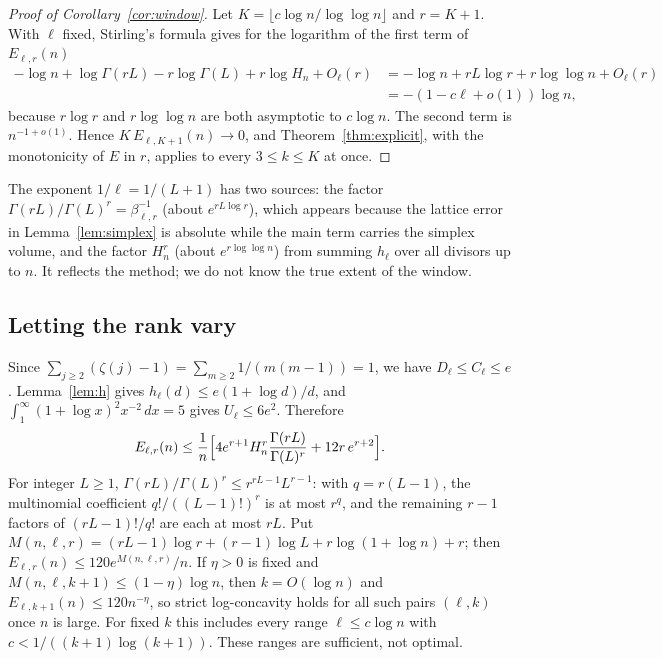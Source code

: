 \documentclass[11pt,a4paper]{article}
\theoremstyle{remark}
\numberwithin{equation}{section}
\begin{document}
\begin{proof}[Proof of Corollary~\ref{cor:window}]
Let $K=\lfloor c\log n/\log\log n\rfloor$ and $r=K+1$. With $\ell$ fixed, Stirling's formula gives for the logarithm of the first term of $E_{\ell,r}(n)$
\[
\begin{aligned}-\log n+\log\Gamma(rL)-r\log\Gamma(L)+r\log H_n+O_\ell(r)&=-\log n+rL\log r+r\log\log n+O_\ell(r)\\&=-(1-c\ell+o(1))\log n,\end{aligned}
\]
because $r\log r$ and $r\log\log n$ are both asymptotic to $c\log n$. The second term is $n^{-1+o(1)}$. Hence $K\,E_{\ell,K+1}(n)\to0$, and Theorem~\ref{thm:explicit}, with the monotonicity of $E$ in $r$, applies to every $3\le k\le K$ at once.
\end{proof}

The exponent $1/\ell=1/(L+1)$ has two sources: the factor $\Gamma(rL)/\Gamma(L)^r=\beta_{\ell,r}^{-1}$ (about $e^{rL\log r}$), which appears because the lattice error in Lemma~\ref{lem:simplex} is absolute while the main term carries the simplex volume, and the factor $H_n^r$ (about $e^{r\log\log n}$) from summing $h_\ell$ over all divisors up to $n$. It reflects the method; we do not know the true extent of the window.

\subsection{Letting the rank vary}
Since $\sum_{j\ge2}(\zeta(j)-1)=\sum_{m\ge2}1/(m(m-1))=1$, we have $D_\ell\le C_\ell\le e$. Lemma~\ref{lem:h} gives $h_\ell(d)\le e(1+\log d)/d$, and $\int_1^\infty(1+\log x)^2x^{-2}\,dx=5$ gives $U_\ell\le6e^2$. Therefore
\begin{equation}\label{eq:Erank}
E_{\ell,r}(n)\le\frac1n\Bigl[4e^{r+1}H_n^r\frac{\Gamma(rL)}{\Gamma(L)^r}+12r\,e^{r+2}\Bigr].
\end{equation}
For integer $L\ge1$, $\Gamma(rL)/\Gamma(L)^r\le r^{rL-1}L^{r-1}$: with $q=r(L-1)$, the multinomial coefficient $q!/((L-1)!)^r$ is at most $r^q$, and the remaining $r-1$ factors of $(rL-1)!/q!$ are each at most $rL$. Put $M(n,\ell,r)=(rL-1)\log r+(r-1)\log L+r\log(1+\log n)+r$; then $E_{\ell,r}(n)\le120e^{M(n,\ell,r)}/n$. If $\eta>0$ is fixed and $M(n,\ell,k+1)\le(1-\eta)\log n$, then $k=O(\log n)$ and $E_{\ell,k+1}(n)\le120n^{-\eta}$, so strict log-concavity holds for all such pairs $(\ell,k)$ once $n$ is large. For fixed $k$ this includes every range $\ell\le c\log n$ with $c<1/((k+1)\log(k+1))$. These ranges are sufficient, not optimal.
\end{document}
